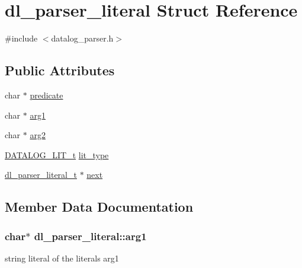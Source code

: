 \hypertarget{structdl__parser__literal}{}\section{dl\+\_\+parser\+\_\+literal Struct Reference}
\label{structdl__parser__literal}


{\ttfamily \#include $<$datalog\+\_\+parser.\+h$>$}

\subsection*{Public Attributes}
\begin{DoxyCompactItemize}
\item 
char $\ast$ \hyperlink{structdl__parser__literal_a29b6704d93332f103bd46525b651c62e}{predicate}
\item 
char $\ast$ \hyperlink{structdl__parser__literal_a13d39bca7ac508dbade23c5068d02a17}{arg1}
\item 
char $\ast$ \hyperlink{structdl__parser__literal_a069378d1cdd069e6e3131c25c6f6fe40}{arg2}
\item 
\hyperlink{datalog__api_8h_ad27ac7b01e9690a8c6d1bd37e131a421}{D\+A\+T\+A\+L\+O\+G\+\_\+\+L\+I\+T\+\_\+t} \hyperlink{structdl__parser__literal_a8e4ab2c8fdcdf404c30069f9abd12544}{lit\+\_\+type}
\item 
\hyperlink{datalog__parser_8h_adaef2eede58b9f7698925f7194af1373}{dl\+\_\+parser\+\_\+literal\+\_\+t} $\ast$ \hyperlink{structdl__parser__literal_af1e52e4932e62608901b911045b566b7}{next}
\end{DoxyCompactItemize}


\subsection{Member Data Documentation}
\subsubsection[{\texorpdfstring{arg1}{arg1}}]{\setlength{\rightskip}{0pt plus 5cm}char$\ast$ dl\+\_\+parser\+\_\+literal\+::arg1}\hypertarget{structdl__parser__literal_a13d39bca7ac508dbade23c5068d02a17}{}\label{structdl__parser__literal_a13d39bca7ac508dbade23c5068d02a17}
string literal of the literal\textquotesingle{}s arg1 
